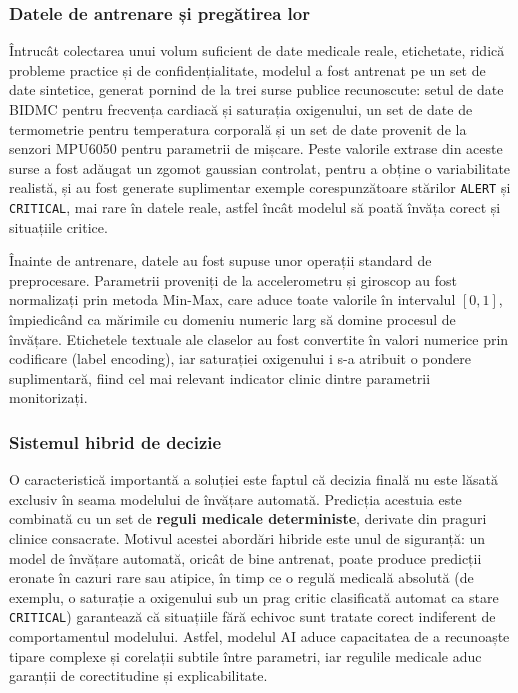 \documentclass[12pt,a4paper,twoside]{article}
\begin{document}
\subsubsection{Datele de antrenare și pregătirea lor}

Întrucât colectarea unui volum suficient de date medicale reale, etichetate, ridică probleme practice și de confidențialitate, modelul a fost antrenat pe un set de date sintetice, generat pornind de la trei surse publice recunoscute: setul de date BIDMC pentru frecvența cardiacă și saturația oxigenului, un set de date de termometrie pentru temperatura corporală și un set de date provenit de la senzori MPU6050 pentru parametrii de mișcare. Peste valorile extrase din aceste surse a fost adăugat un zgomot gaussian controlat, pentru a obține o variabilitate realistă, și au fost generate suplimentar exemple corespunzătoare stărilor \texttt{ALERT} și \texttt{CRITICAL}, mai rare în datele reale, astfel încât modelul să poată învăța corect și situațiile critice.

Înainte de antrenare, datele au fost supuse unor operații standard de preprocesare. Parametrii proveniți de la accelerometru și giroscop au fost normalizați prin metoda Min-Max, care aduce toate valorile în intervalul $[0, 1]$, împiedicând ca mărimile cu domeniu numeric larg să domine procesul de învățare. Etichetele textuale ale claselor au fost convertite în valori numerice prin codificare (label encoding), iar saturației oxigenului i s-a atribuit o pondere suplimentară, fiind cel mai relevant indicator clinic dintre parametrii monitorizați.

\subsubsection{Sistemul hibrid de decizie}

O caracteristică importantă a soluției este faptul că decizia finală nu este lăsată exclusiv în seama modelului de învățare automată. Predicția acestuia este combinată cu un set de \textbf{reguli medicale deterministe}, derivate din praguri clinice consacrate. Motivul acestei abordări hibride este unul de siguranță: un model de învățare automată, oricât de bine antrenat, poate produce predicții eronate în cazuri rare sau atipice, în timp ce o regulă medicală absolută (de exemplu, o saturație a oxigenului sub un prag critic clasificată automat ca stare \texttt{CRITICAL}) garantează că situațiile fără echivoc sunt tratate corect indiferent de comportamentul modelului. Astfel, modelul AI aduce capacitatea de a recunoaște tipare complexe și corelații subtile între parametri, iar regulile medicale aduc garanții de corectitudine și explicabilitate.
\end{document}
